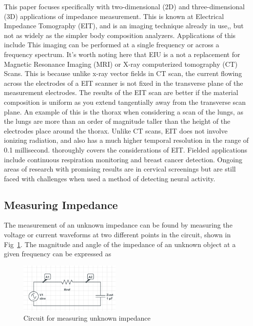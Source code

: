 \documentclass[]{IEEEtran}
\begin{document}
This paper focuses specifically with two-dimensional (2D) and three-dimensional (3D) applications of impedance measurement. This is known at Electrical Impedance Tomography (EIT), and is an imaging technique already in use\cite{noauthor_body_nodate},\cite{noauthor_our_nodate}, but not as widely as the simpler body composition analyzers. Applications of this include  This imaging can be performed at a single frequency or across a frequency spectrum. It's worth noting here that EIU is a not a replacement for Magnetic Resonance Imaging (MRI) or X-ray computerized tomography (CT) Scans. This is because unlike x-ray vector fields in CT scan, the current flowing across the electrodes of a EIT scanner is not fixed in the transverse plane of the measurement electrodes. The results of the EIT scan are better if the material composition is uniform as you extend tangentially away from the transverse scan plane. An example of this is the thorax when considering a scan of the lungs, as the lungs are more than an order of magnitude taller than the height of the electrodes place around the thorax. Unlike CT scans, EIT does not involve ionizing radiation, and also has a much higher temporal resolution in the range of 0.1 millisecond\cite{noauthor_electrical_2004}. \cite{adler_electrical_2017} thoroughly covers the considerations of EIT. Fielded applications include continuous respiration monitoring and breast cancer detection\cite{assenheimer_t-scan_2001}. Ongoing areas of research with promising results are in cervical screenings\cite{brown_relation_2000} but are still faced with challenges when used a method of detecting neural activity\cite{gilad_impedance_2009}.

\subsection{Measuring Impedance}
The measurement of an unknown impedance can be found by measuring the voltage or current waveforms at two different points in the circuit, shown in Fig~\ref{fig:zun}\cite{noauthor_oscilloscope_nodate}. The magnitude and angle of the impedance of an unknown object at a given frequency can be expressed as

\begin{figure} %
\centering
\includegraphics[width=5cm ]{./graphics/zun.png}
\centering
\caption{Circuit for measuring unknown impedance}
\label{fig:zun}
\end{figure}
\end{document}
